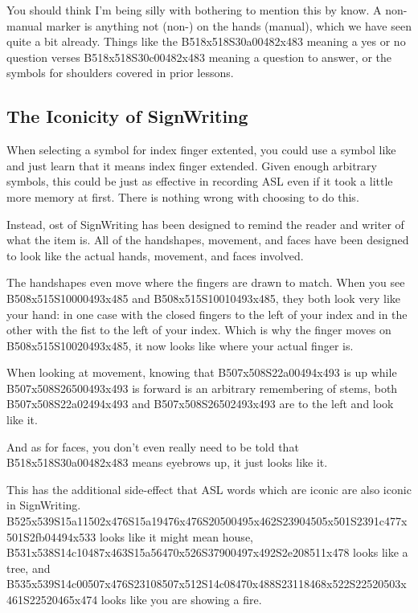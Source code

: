 \documentclass{article}
\begin{document}
You should think I'm being silly with bothering to mention this by know.
A non-manual marker is anything not (non-) on the hands (manual), which we have seen quite a bit already.
Things like the B518x518S30a00482x483 meaning a yes or no question verses B518x518S30c00482x483 meaning a question to answer, or the symbols for shoulders covered in prior lessons.

\subsection{The Iconicity of SignWriting}

When selecting a symbol for index finger extented, you could use a symbol like  and just learn that it means index finger extended.
Given enough arbitrary symbols, this could be just as effective in recording ASL even if it took a little more memory at first.
There is nothing wrong with choosing to do this.

Instead, ost of SignWriting has been designed to remind the reader and writer of what the item is.
All of the handshapes, movement, and faces have been designed to look like the actual hands, movement, and faces involved.

The handshapes even move where the fingers are drawn to match.
When you see B508x515S10000493x485 and B508x515S10010493x485, they both look very like your hand: in one case with the closed fingers to the left of your index and in the other with the fist to the left of your index.
Which is why the finger moves on B508x515S10020493x485, it now looks like where your actual finger is.

When looking at movement, knowing that B507x508S22a00494x493 is up while B507x508S26500493x493 is forward is an arbitrary remembering of stems, both B507x508S22a02494x493 and B507x508S26502493x493 are to the left and look like it.

And as for faces, you don't even really need to be told that B518x518S30a00482x483 means eyebrows up, it just looks like it.

This has the additional side-effect that ASL words which are iconic are also iconic in SignWriting.
B525x539S15a11502x476S15a19476x476S20500495x462S23904505x501S2391c477x501S2fb04494x533 looks like it might mean house, B531x538S14c10487x463S15a56470x526S37900497x492S2e208511x478 looks like a tree, and B535x539S14c00507x476S23108507x512S14c08470x488S23118468x522S22520503x461S22520465x474 looks like you are showing a fire.
\end{document}
